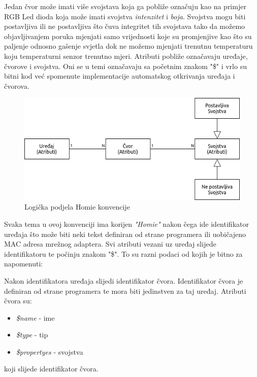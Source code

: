 \documentclass[times, utf8, zavrsni]{fer}
\begin{document}
Jedan čvor može imati više svojstava koja ga pobliže označuju kao na primjer RGB Led dioda koja može imati svojstva \textit{intenzitet} i \textit{boja}.
Svojstva mogu biti postavljiva ili ne postavljiva što čuva integritet tih svojstava tako da možemo objavljivanjem poruka mjenjati samo vrijednosti koje su promjenjive kao što su paljenje odnosno gašenje svjetla dok ne možemo mjenjati trenutnu temperaturu koju temperaturni senzor trenutno mjeri.
Atributi pobliže označavaju uređaje, čvorove i svojstva.
Oni se u temi označavaju sa početnim znakom "\$" i vrlo su bitni kod već spomenute implementacije automatskog otkrivanja uređaja i čvorova.
\begin{figure}[h]
    \centering
    \includegraphics[scale=0.5]{Homie.png}
    \caption{Logička podjela Homie konvencije}
\end{figure}

Svaka tema u ovoj konvenciji ima korijen \textit{"Homie"} nakon čega ide identifikator uređaja što može biti neki tekst definiran od strane programera ili uobičajeno MAC adresa mrežnog adaptera.
Svi atributi vezani uz uređaj slijede identifikatoru te počinju znakom "\$".
To su razni podaci od kojih je bitno za napomenuti:

Nakon identifikatora uređaja slijedi identifikator čvora.
Identifikator čvora je definiran od strane programera te mora biti jedinstven za taj uređaj.
Atributi čvora su:
\begin{itemize}
    \item \textit{\$name} - ime
    \item \textit{\$type} - tip
    \item \textit{\$propertyes} - svojstva 
\end{itemize}
koji slijede identifikator čvora.
\end{document}
